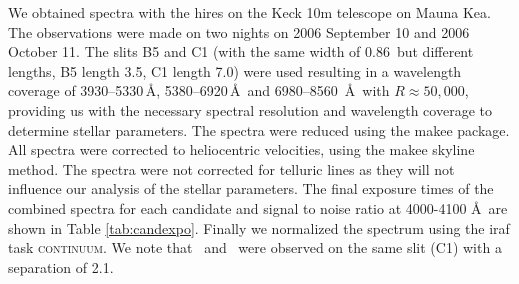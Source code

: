 We obtained spectra with the \gls{hires} on the Keck 10m telescope on Mauna Kea. The observations were made on two nights on 2006 September 10 and 2006 October 11.  The slits B5 and C1 (with the same width of 0.86\arcsec\ but different lengths, B5 length 3.5\arcsec, C1 length 7.0\arcsec) were used resulting in a wavelength coverage of 3930--5330\,\AA, 5380--6920\,\AA\ and 6980--8560~\AA\ with $R\approx 50,000$, providing us with the necessary spectral resolution and wavelength coverage to determine stellar parameters. 
The spectra were reduced using the \gls{makee} package. All spectra were corrected to heliocentric velocities, using the \gls{makee} skyline method. The spectra were not corrected for telluric lines as they will not influence our analysis of the stellar parameters. The final exposure times of the combined spectra for each candidate and signal to noise ratio at 4000-4100 \AA\ are shown in Table \ref{tab:candexpo}. Finally we normalized the spectrum using the \gls{iraf} task \textsc{continuum}. We note that \starc\ and \stard\ were observed on the same slit (C1) with a separation of 2.1\arcsec.



